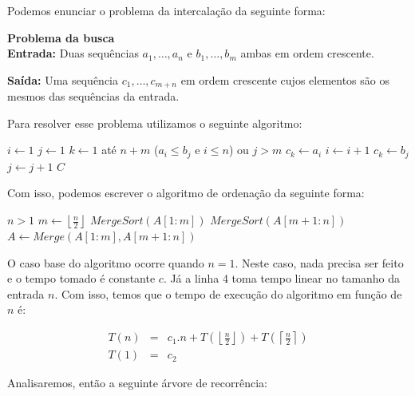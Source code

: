 Podemos enunciar o problema da intercalação da seguinte forma:


{\bf Problema da busca}\\

{\bf Entrada:} Duas sequências $a_1, \dots, a_n$ e $b_1, \dots, b_m$ ambas em ordem crescente.

{\bf Saída:} Uma sequência $c_1, \dots, c_{m+n}$ em ordem crescente cujos elementos são os mesmos das sequências da entrada.

Para resolver esse problema utilizamos o seguinte algoritmo:

\begin{codebox}
  \li $i \gets 1$
  \li $j \gets 1$
  \li \For $k \gets 1$ até $n+m$
  \li \Do \If ($a_i \leq b_j$ e $i \leq n$) ou $j > m$
  \li \Then $c_k \gets a_i$
  \li $i \gets i + 1$
  \li \Else
  \li $c_k \gets b_j$
  \li $j \gets j + 1$
  \End
  \End
  \li \Return $C$
\end{codebox}

Com isso, podemos escrever o algoritmo de ordenação da seguinte forma:

\begin{codebox}
  \li \If $n > 1$
  \li \Then  $m \gets \left \lfloor{\frac{n}{2}}\right\rfloor$
  \li $MergeSort(A[1:m])$
  \li $MergeSort(A[m+1:n])$
  \li $A \gets Merge(A[1:m], A[m+1:n])$
\end{codebox}

O caso base do algoritmo ocorre quando $n = 1$.
Neste caso, nada precisa ser feito e o tempo tomado é constante $c$.
Já a linha 4 toma tempo linear no tamanho da entrada $n$.
Com isso, temos que o tempo de execução do algoritmo em função de $n$ é:

\begin{eqnarray*}
  T(n) & = & c_1.n + T(\left \lfloor{\frac{n}{2}}\right\rfloor) + T(\left \lceil{\frac{n}{2}}\right\rceil)\\
  T(1) & = & c_2
\end{eqnarray*}

Analisaremos, então a seguinte árvore de recorrência:


